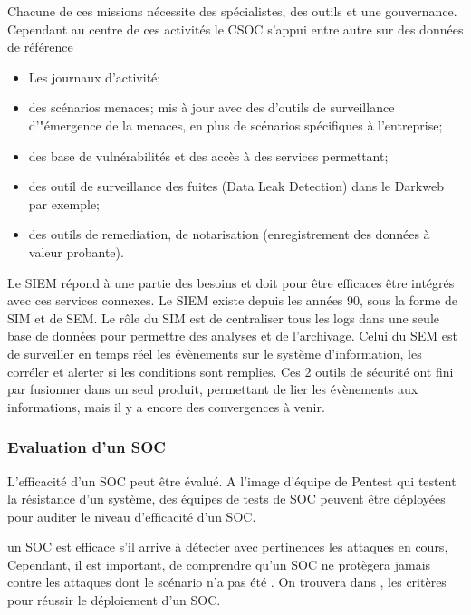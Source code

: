 Chacune de ces missions nécessite des spécialistes, des outils et une gouvernance. Cependant au centre de ces activités  le CSOC s’appui entre autre sur des données de référence
\begin{itemize}
  \item Les journaux d'activité;
  \item des scénarios menaces; mis à jour avec des d'outils de surveillance d'"émergence de la menaces, en plus de scénarios spécifiques à l'entreprise;
  \item des base de vulnérabilités et des accès à des services permettant;
  \item des outil de surveillance des fuites (Data Leak Detection) dans le Darkweb par exemple;
  \item des outils de remediation, de notarisation (enregistrement des données à valeur probante).
\end{itemize}

Le SIEM répond à une partie des besoins et doit pour être efficaces être intégrés avec ces services connexes.
Le SIEM existe depuis les années 90, sous la forme de SIM et de SEM. Le rôle du SIM est de centraliser tous les logs dans une seule base de données pour permettre des analyses et de l’archivage. Celui du SEM est de surveiller en temps réel les évènements sur le système d’information, les corréler et alerter si les conditions sont remplies. Ces 2 outils de sécurité ont fini par fusionner dans un seul produit, permettant de lier les évènements aux informations, mais il y a encore des convergences à venir.



\subsubsection{Evaluation d'un SOC}

L'efficacité d'un SOC peut être évalué. A l'image d'équipe de Pentest qui testent la résistance d'un système, des équipes de tests de SOC peuvent être déployées pour auditer le niveau d'efficacité d'un SOC.


un SOC est efficace s’il arrive à détecter avec pertinences les attaques en cours,  Cependant, il est important, de comprendre qu’un SOC ne protègera jamais contre les attaques dont le scénario n'a pas été . On trouvera dans , les critères pour réussir le déploiement d'un SOC.

